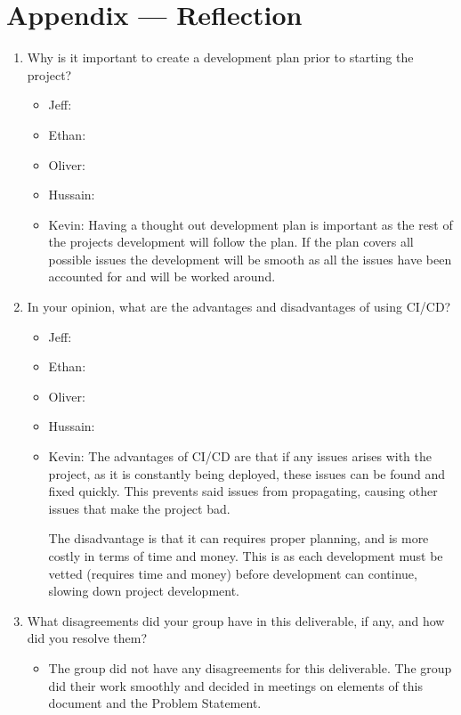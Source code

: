 \documentclass{article}
\begin{document}
\newpage{}

\section*{Appendix --- Reflection}




\begin{enumerate}
    \item Why is it important to create a development plan prior to starting the
    project?
	\begin{itemize}
		\item Jeff:
		\item Ethan:
		\item Oliver:
		\item Hussain:
		\item Kevin: Having a thought out development plan is important as the rest of the projects development will follow the plan. If the plan covers all possible issues the development will be smooth as all the issues have been accounted for and will be worked around. 
	\end{itemize}
    \item In your opinion, what are the advantages and disadvantages of using
    CI/CD?
	\begin{itemize}
		\item Jeff:
		\item Ethan:
		\item Oliver:
		\item Hussain:
		\item Kevin: The advantages of CI/CD are that if any issues arises with the project, as it is constantly being deployed, these issues can be found and fixed quickly. This prevents said issues from propagating, causing other issues that make the project bad.
		
		The disadvantage is that it can requires proper planning, and is more costly in terms of time and money. This is as each development must be vetted (requires time and money) before development can continue, slowing down project development. 


	\end{itemize}
    \item What disagreements did your group have in this deliverable, if any,
    and how did you resolve them?
    
   \begin{itemize}
		\item The group did not have any disagreements for this deliverable. The group did their work smoothly and decided in meetings on elements of this document and the Problem Statement.
	\end{itemize}
\end{enumerate}
\end{document}

